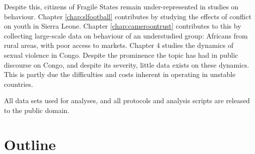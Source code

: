 Despite this, citizens of Fragile States remain under-represented in studies on behaviour. Chapter \ref{chap:slfootball} contributes by studying the effects of conflict on youth in Sierra Leone. Chapter \ref{chap:cameroontrust} contributes to this by collecting large-scale data on behaviour of an understudied group: Africans from rural areas, with poor access to markets. Chapter 4 studies the dynamics of sexual violence in Congo. Despite the prominence the topic has had in public discourse on Congo, and despite its severity, little data exists on these dynamics. This is partly due the difficulties and costs inherent in operating in unstable countries.



All data sets used for analyses, and all protocols and analysis scripts are released to the public domain.






\section{Outline}


\clearpage 


